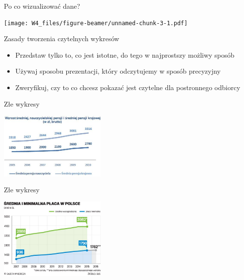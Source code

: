\documentclass[ignorenonframetext,]{beamer}
\providecommand{\tightlist}{%
\setlength{\itemsep}{0pt}\setlength{\parskip}{0pt}}
\begin{document}
\begin{frame}{Po co wizualizować dane?}

\texttt{[image: W4\_files/figure-beamer/unnamed-chunk-3-1.pdf]}

\end{frame}

\begin{frame}{Zasady tworzenia czytelnych wykresów}

\begin{itemize}
\tightlist
\item
  Przedstaw tylko to, co jest istotne, do tego w najprostszy możliwy
  sposób
\item
  Używaj sposobu prezentacji, który odczytujemy w sposób precyzyjny
\item
  Zweryfikuj, czy to co chcesz pokazać jest czytelne dla postronnego
  odbiorcy
\end{itemize}

\end{frame}

\begin{frame}{Złe wykresy}

\begin{center}\includegraphics[width=200px]{images/pensja1} \end{center}

\end{frame}

\begin{frame}{Złe wykresy}

\begin{center}\includegraphics[width=200px]{images/pensja2} \end{center}

\end{frame}
\end{document}
